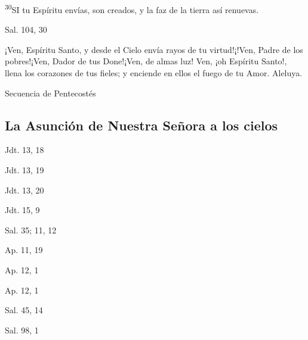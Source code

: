 \documentclass[a4paper,11pt]{article}
\begin{document}
      \textsuperscript{30}SI tu Espíritu envías, son creados, y la faz de la tierra así renuevas.
      \begin{flushright}
        Sal. 104, 30
      \end{flushright}      
      ¡Ven, Espíritu Santo, y desde el Cielo envía rayos de tu virtud!¡!Ven, Padre de los pobres!¡Ven, Dador de tus Done!¡Ven, de almas luz!
      Ven, ¡oh Espíritu Santo!, llena los corazones de tus fieles; y enciende en ellos el fuego de tu Amor. Aleluya.
      \begin{flushright}
        Secuencia de Pentecostés
      \end{flushright}
    \subsection*{\hfil La Asunción de Nuestra Señora a los cielos \hfil}
      \begin{flushright}
        Jdt. 13, 18
      \end{flushright}      
      \begin{flushright}
        Jdt. 13, 19
      \end{flushright}      
      \begin{flushright}
        Jdt. 13, 20
      \end{flushright}      
      \begin{flushright}
        Jdt. 15, 9
      \end{flushright}      
      \begin{flushright}
        Sal. 35; 11, 12
      \end{flushright}      
      \begin{flushright}
        Ap. 11, 19
      \end{flushright}      
      \begin{flushright}
        Ap. 12, 1
      \end{flushright}      
      \begin{flushright}
        Ap. 12, 1
      \end{flushright}      
      \begin{flushright}
        Sal. 45, 14
      \end{flushright}      
      \begin{flushright}
        Sal. 98, 1
      \end{flushright}
\end{document}
